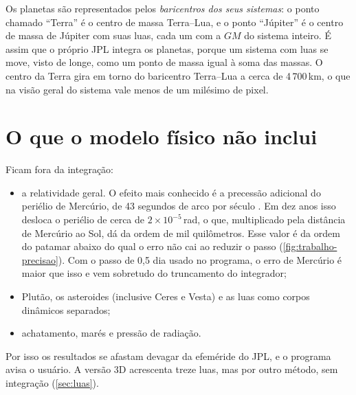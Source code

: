 Os planetas são representados pelos \emph{baricentros dos seus sistemas}: o ponto chamado ``Terra'' é o centro de massa Terra--Lua, e o ponto ``Júpiter'' é o centro de massa de Júpiter com suas luas, cada um com a $GM$ do sistema inteiro. É assim que o próprio JPL integra os planetas, porque um sistema com luas se move, visto de longe, como um ponto de massa igual à soma das massas. O centro da Terra gira em torno do baricentro Terra--Lua a cerca de 4\,700\,km, o que na visão geral do sistema vale menos de um milésimo de pixel.

\section{O que o modelo físico não inclui}\label{sec:nao-inclui}

Ficam fora da integração:

\begin{itemize}
  \item a relatividade geral. O efeito mais conhecido é a precessão adicional do periélio de Mercúrio, de 43 segundos de arco por século \cite{will2018}. Em dez anos isso desloca o periélio de cerca de $2\times10^{-5}$\,rad, o que, multiplicado pela distância de Mercúrio ao Sol, dá da ordem de mil quilômetros. Esse valor é da ordem do patamar abaixo do qual o erro não cai ao reduzir o passo (\autoref{fig:trabalho-precisao}). Com o passo de 0,5 dia usado no programa, o erro de Mercúrio é maior que isso e vem sobretudo do truncamento do integrador;
  \item Plutão, os asteroides (inclusive Ceres e Vesta) e as luas como corpos dinâmicos separados;
  \item achatamento, marés e pressão de radiação.
\end{itemize}

Por isso os resultados se afastam devagar da efeméride do JPL, e o programa avisa o usuário. A versão 3D acrescenta treze luas, mas por outro método, sem integração (\autoref{sec:luas}).
